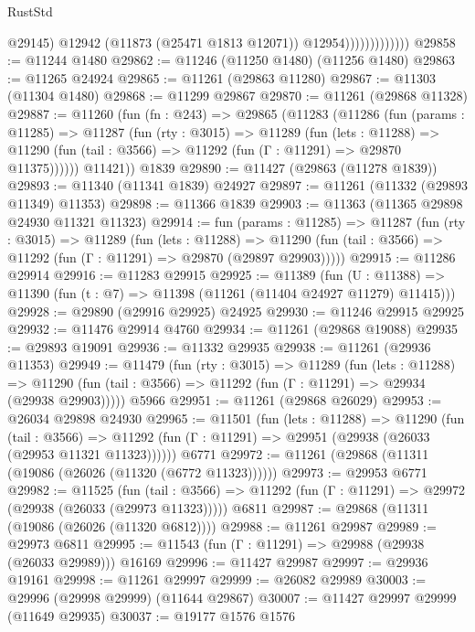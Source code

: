 \begin{lexlean}{RustStd}
\begin{coremodule}
                                @29145)
                              @12942
                              (@11873 (@25471 @1813 @12071))
                              @12954)))))))))))))
@29858 := @11244 @1480
@29862 := @11246 (@11250 @1480) (@11256 @1480)
@29863 := @11265 @24924
@29865 := @11261 (@29863 @11280)
@29867 := @11303 (@11304 @1480)
@29868 := @11299 @29867
@29870 := @11261 (@29868 @11328)
@29887 := @11260
    (fun (fn : @243) =>
    @29865
      (@11283
        (@11286
          (fun (params : @11285) =>
          @11287
            (fun (rty : @3015) =>
            @11289
              (fun (lets : @11288) =>
              @11290 (fun (tail : @3566) => @11292 (fun (Γ : @11291) => @29870 @11375))))))
        @11421))
    @1839
@29890 := @11427 (@29863 (@11278 @1839))
@29893 := @11340 (@11341 @1839) @24927
@29897 := @11261 (@11332 (@29893 @11349) @11353)
@29898 := @11366 @1839
@29903 := @11363 (@11365 @29898 @24930 @11321 @11323)
@29914 := fun (params : @11285) =>
  @11287
    (fun (rty : @3015) =>
    @11289
      (fun (lets : @11288) =>
      @11290 (fun (tail : @3566) => @11292 (fun (Γ : @11291) => @29870 (@29897 @29903)))))
@29915 := @11286 @29914
@29916 := @11283 @29915
@29925 := @11389
    (fun (U : @11388) => @11390 (fun (t : @7) => @11398 (@11261 (@11404 @24927 @11279) @11415)))
@29928 := @29890 (@29916 @29925) @24925
@29930 := @11246 @29915 @29925
@29932 := @11476 @29914 @4760
@29934 := @11261 (@29868 @19088)
@29935 := @29893 @19091
@29936 := @11332 @29935
@29938 := @11261 (@29936 @11353)
@29949 := @11479
    (fun (rty : @3015) =>
    @11289
      (fun (lets : @11288) =>
      @11290 (fun (tail : @3566) => @11292 (fun (Γ : @11291) => @29934 (@29938 @29903)))))
    @5966
@29951 := @11261 (@29868 @26029)
@29953 := @26034 @29898 @24930
@29965 := @11501
    (fun (lets : @11288) =>
    @11290
      (fun (tail : @3566) =>
      @11292 (fun (Γ : @11291) => @29951 (@29938 (@26033 (@29953 @11321 @11323))))))
    @6771
@29972 := @11261 (@29868 (@11311 (@19086 (@26026 (@11320 (@6772 @11323))))))
@29973 := @29953 @6771
@29982 := @11525
    (fun (tail : @3566) => @11292 (fun (Γ : @11291) => @29972 (@29938 (@26033 (@29973 @11323)))))
    @6811
@29987 := @29868 (@11311 (@19086 (@26026 (@11320 @6812))))
@29988 := @11261 @29987
@29989 := @29973 @6811
@29995 := @11543 (fun (Γ : @11291) => @29988 (@29938 (@26033 @29989))) @16169
@29996 := @11427 @29987
@29997 := @29936 @19161
@29998 := @11261 @29997
@29999 := @26082 @29989
@30003 := @29996 (@29998 @29999) (@11644 @29867)
@30007 := @11427 @29997 @29999 (@11649 @29935)
@30037 := @19177
    @1576
    @1576

\end{coremodule}
\end{lexlean}

